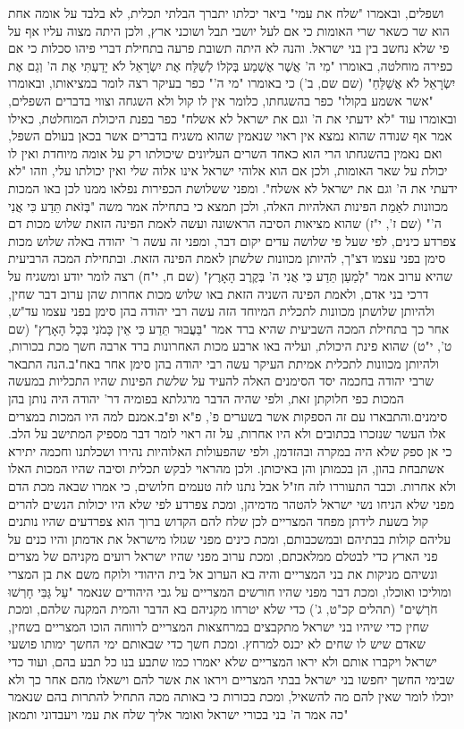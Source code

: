 \documentclass[12pt, openany]{book}
\begin{document}
ושפלים, ובאמרו "שלח את עמי" ביאר יכלתו יתברך הבלתי תכלית, לא בלבד על אומה אחת הוא שר כשאר שרי האומות כי אם לעל יושבי תבל ושוכני ארץ, ולכן היתה מצוה עליו אף על פי שלא נחשב בין בני ישראל. והנה לא היתה תשובת פרעה בתחילת דברי פיהו סכלות כי אם כפירה מוחלטה, באומרו "מִי ה' אֲשֶׁר אֶשְׁמַע בְּקֹלוֹ לְשַׁלַּח אֶת יִשְׂרָאֵל לֹא יָדַעְתִּי אֶת ה' וְגַם אֶת יִשְׂרָאֵל לֹא אֲשַׁלֵּחַ" (שם שם, ב') כי באומרו "מי ה'" כפר בעיקר רצה לומר במציאותו, ובאומרו "אשר אשמע בקולו" כפר בהשגחתו, כלומר אין לו קול ולא השגחה וצווי בדברים השפלים, ובאומרו עוד "לא ידעתי את ה' וגם את ישראל לא אשלח" כפר בפנת היכולת המוחלטת, כאילו אמר אף שנודה שהוא נמצא אין ראוי שנאמין שהוא משגיח בדברים אשר בכאן בעולם השפל, ואם נאמין בהשגחתו הרי הוא כאחד השרים העליונים שיכולתו רק על אומה מיוחדת ואין לו יכולת על שאר האומות, ולכן אם הוא אלוהי ישראל אינו אלוה שלי ואין יכולתו עלי, וזהו "לא ידעתי את ה' וגם את ישראל לא אשלח".  ומפני ששלושת הכפירות נפלאו ממנו לכן באו המכות מכוונות לאַמֵת הפינות האלהיות האלה, ולכן תמצא כי בתחילה אמר משה "בְּזֹאת תֵּדַע כִּי אֲנִי ה'" (שם ז', י"ז) שהוא מציאות הסיבה הראשונה ועשה לאמת הפינה הזאת שלוש מכות דם צפרדע כינים, לפי שעל פי שלושה עדים יקום דבר, ומפני זה עשה ר' יהודה באלה שלוש מכות סימן בפני עצמו דצ"ך, להיותן מכוונות שלשתן לאמת הפינה הזאת. ובתחילת המכה הרביעית שהיא ערוב אמר "לְמַעַן תֵּדַע כִּי אֲנִי ה' בְּקֶרֶב הָאָרֶץ" (שם ח, י"ח) רצה לומר יודע ומשגיח על דרכי בני אדם, ולאמת הפינה השניה הזאת באו שלוש מכות אחרות שהן ערוב דבר שחין, ולהיותן שלושתן מכוונות לתכלית המיוחד הזה עשה רבי יהודה בהן סימן בפני עצמו עד"ש, אחר כך בתחילת המכה השביעית שהיא ברד אמר "בַּעֲבוּר תֵּדַע כִּי אֵין כָּמֹנִי בְּכָל הָאָרֶץ" (שם ט', י"ט) שהוא פינת היכולת, ועליה באו ארבע מכות האחרונות ברד ארבה חשך מכת בכורות, ולהיותן מכוונות לתכלית אמיתת העיקר עשה רבי יהודה בהן סימן אחר באח"ב.הנה התבאר שרבי יהודה בחכמה יסד הסימנים האלה להעיד על שלשת הפינות שהיו התכליות במעשה המכות כפי חלוקתן זאת, ולפי שהיה הדבר מרגלתא בפומיה דר' יהודה היה נותן בהן סימנים.והתבארו עם זה הספקות אשר בשערים פ', פ"א ופ"ב.אמנם למה היו המכות במצרים אלו העשר שנזכרו בכתובים ולא היו אחרות, על זה ראוי לומר דבר מספיק המתישב על הלב. כי אן ספק שלא היה במקרה ובהזדמן, ולפי שהפעולות האלוהיות נהירו ושכלתנו וחכמה יתירא אשתבחת בהון, הן בכמותן והן באיכותן. ולכן מהראוי לבקש תכלית וסיבה שהיו המכות האלו ולא אחרות. וכבר התעוררו לזה חז"ל אבל נתנו לזה טעמים חלושים, כי אמרו שבאה מכת הדם מפני שלא הניחו נשי ישראל להטהר מדמיהן, ומכת צפרדע לפי שלא היו יכולות הנשים להרים קול בשעת לידתן מפחד המצריים לכן שלח להם הקדוש ברוך הוא צפרדעים שהיו נותנים עליהם קולות בבתיהם ובמשכבותם, ומכת כינים מפני שגזלו מישראל את אדמתן והיו כנים על פני הארץ כדי לבטלם ממלאכתם, ומכת ערוב מפני שהיו ישראל רועים מקניהם של מצרים ונשיהם מניקות את בני המצריים והיה בא הערוב אל בית היהודי ולוקח משם את בן המצרי ומוליכו ואוכלו, ומכת דבר מפני שהיו חורשים המצריים על גבי היהודים שנאמר "עַל גַּבִּי חָרְשׁוּ חֹרְשִׁים" (תהלים קכ"ט, ג') כדי שלא יטרחו מקניהם בא הדבר והמית המקנה שלהם, ומכת שחין כדי שיהיו בני ישראל מתקבצים במרחצאות המצריים לרווחה הוכו המצריים בשחין, שאדם שיש לו שחים לא יכנס למרחץ.  ומכת חשך כדי שבאותם ימי החשך ימותו פושעי ישראל ויקברו אותם ולא יראו המצריים שלא יאמרו כמו שתבע בנו כל תבע בהם, ועוד כדי שבימי החשך יחפשו בני ישראל בבתי המצריים ויראו את אשר להם וישאלו מהם אחר כך ולא יוכלו לומר שאין להם מה להשאיל, ומכת בכורות כי באותה מכה התחיל להתרות בהם שנאמר "כה אמר ה' בני בכורי ישראל ואומר אליך שלח את עמי ויעבדוני ותמאן 
\end{document}
